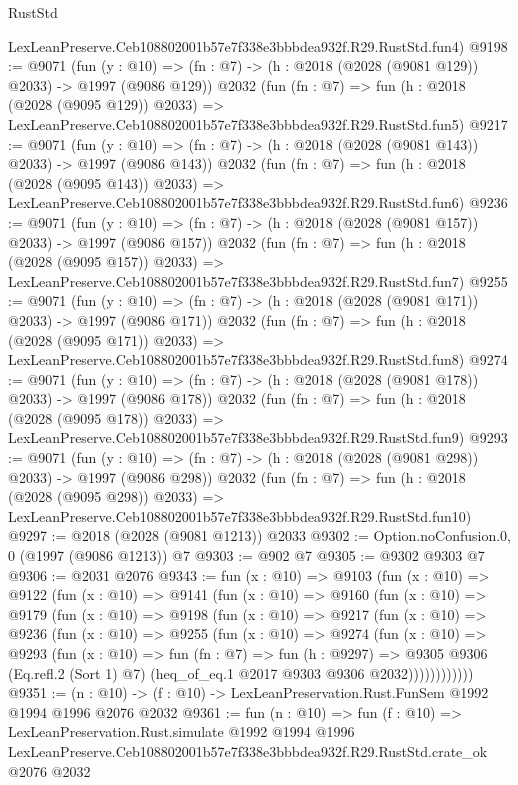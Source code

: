 \begin{lexlean}{RustStd}
\begin{coremodule}
    LexLeanPreserve.Ceb108802001b57e7f338e3bbbdea932f.R29.RustStd.fun4)
@9198 := @9071
    (fun (y : @10) => (fn : @7) -> (h : @2018 (@2028 (@9081 @129)) @2033) -> @1997 (@9086 @129))
    @2032
    (fun (fn : @7) =>
    fun (h : @2018 (@2028 (@9095 @129)) @2033) =>
    LexLeanPreserve.Ceb108802001b57e7f338e3bbbdea932f.R29.RustStd.fun5)
@9217 := @9071
    (fun (y : @10) => (fn : @7) -> (h : @2018 (@2028 (@9081 @143)) @2033) -> @1997 (@9086 @143))
    @2032
    (fun (fn : @7) =>
    fun (h : @2018 (@2028 (@9095 @143)) @2033) =>
    LexLeanPreserve.Ceb108802001b57e7f338e3bbbdea932f.R29.RustStd.fun6)
@9236 := @9071
    (fun (y : @10) => (fn : @7) -> (h : @2018 (@2028 (@9081 @157)) @2033) -> @1997 (@9086 @157))
    @2032
    (fun (fn : @7) =>
    fun (h : @2018 (@2028 (@9095 @157)) @2033) =>
    LexLeanPreserve.Ceb108802001b57e7f338e3bbbdea932f.R29.RustStd.fun7)
@9255 := @9071
    (fun (y : @10) => (fn : @7) -> (h : @2018 (@2028 (@9081 @171)) @2033) -> @1997 (@9086 @171))
    @2032
    (fun (fn : @7) =>
    fun (h : @2018 (@2028 (@9095 @171)) @2033) =>
    LexLeanPreserve.Ceb108802001b57e7f338e3bbbdea932f.R29.RustStd.fun8)
@9274 := @9071
    (fun (y : @10) => (fn : @7) -> (h : @2018 (@2028 (@9081 @178)) @2033) -> @1997 (@9086 @178))
    @2032
    (fun (fn : @7) =>
    fun (h : @2018 (@2028 (@9095 @178)) @2033) =>
    LexLeanPreserve.Ceb108802001b57e7f338e3bbbdea932f.R29.RustStd.fun9)
@9293 := @9071
    (fun (y : @10) => (fn : @7) -> (h : @2018 (@2028 (@9081 @298)) @2033) -> @1997 (@9086 @298))
    @2032
    (fun (fn : @7) =>
    fun (h : @2018 (@2028 (@9095 @298)) @2033) =>
    LexLeanPreserve.Ceb108802001b57e7f338e3bbbdea932f.R29.RustStd.fun10)
@9297 := @2018 (@2028 (@9081 @1213)) @2033
@9302 := Option.noConfusion.{0, 0} (@1997 (@9086 @1213)) @7
@9303 := @902 @7
@9305 := @9302 @9303 @7
@9306 := @2031 @2076
@9343 := fun (x : @10) =>
  @9103
    (fun (x : @10) =>
    @9122
      (fun (x : @10) =>
      @9141
        (fun (x : @10) =>
        @9160
          (fun (x : @10) =>
          @9179
            (fun (x : @10) =>
            @9198
              (fun (x : @10) =>
              @9217
                (fun (x : @10) =>
                @9236
                  (fun (x : @10) =>
                  @9255
                    (fun (x : @10) =>
                    @9274
                      (fun (x : @10) =>
                      @9293
                        (fun (x : @10) =>
                        fun (fn : @7) =>
                        fun (h : @9297) =>
                        @9305
                          @9306
                          (Eq.refl.{2} (Sort 1) @7)
                          (heq_of_eq.{1} @2017 @9303 @9306 @2032))))))))))))
@9351 := (n : @10) -> (f : @10) -> LexLeanPreservation.Rust.FunSem @1992 @1994 @1996 @2076 @2032
@9361 := fun (n : @10) =>
  fun (f : @10) =>
  LexLeanPreservation.Rust.simulate
    @1992
    @1994
    @1996
    LexLeanPreserve.Ceb108802001b57e7f338e3bbbdea932f.R29.RustStd.crate_ok
    @2076
    @2032
\end{coremodule}
\end{lexlean}
